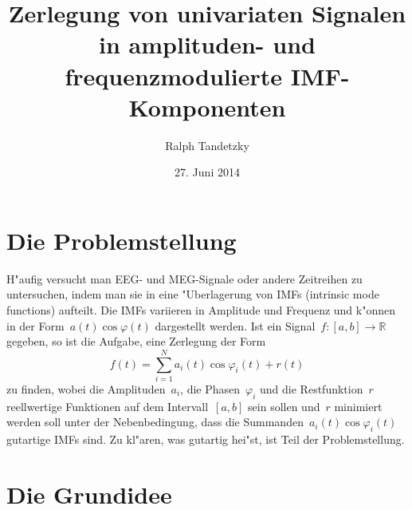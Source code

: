 \documentclass[a4paper]{scrartcl}
\newcommand{\R}{{\mathbb{R}}}
\newcommand{\pphi}{{\varphi}}
\begin{document}

\title{Zerlegung von univariaten Signalen in amplituden- und frequenzmodulierte IMF-Komponenten}
\author{Ralph Tandetzky}
\date{27. Juni 2014}
\maketitle

\section{Die Problemstellung}

H"aufig versucht man EEG- und MEG-Signale oder andere Zeitreihen zu untersuchen, indem man sie in eine "Uberlagerung von IMFs (intrinsic mode functions) aufteilt. 
Die IMFs variieren in Amplitude und Frequenz und k"onnen in der Form~$a(t)\cos\pphi(t)$ dargestellt werden. 
Ist ein Signal~$f:[a,b]\to\R$ gegeben, so ist die Aufgabe, eine Zerlegung der Form 
$$ f(t) = \sum_{i=1}^N a_i(t)\cos\pphi_i(t) + r(t) $$
zu finden, wobei die Amplituden~$a_i$, die Phasen~$\pphi_i$ und die Restfunktion~$r$ reellwertige Funktionen auf dem Intervall~$[a,b]$ sein sollen und~$r$ minimiert werden soll unter der Nebenbedingung, dass die Summanden~$a_i(t)\cos\pphi_i(t)$ gutartige IMFs sind. 
Zu kl"aren, was \glqq{}gutartig\grqq{} hei"st, ist Teil der Problemstellung. 


\section{Die Grundidee}
\end{document}
